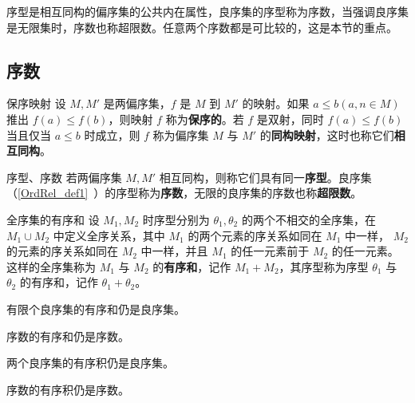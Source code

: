 序型是相互同构的偏序集的公共内在属性，良序集的序型称为序数，当强调良序集是无限集时，序数也称超限数。任意两个序数都是可比较的，这是本节的重点。
\subsection{序数}
\begin{definition}{保序映射}
设 $M,M'$ 是两偏序集，$f$ 是 $M$ 到 $M'$ 的映射。如果 $a\leq b(a,n\in M)$ 推出 $f(a)\leq f(b)$，则映射 $f$ 称为\textbf{保序的}。若 $f$ 是双射，同时 $f(a)\leq f(b)$ 当且仅当 $a\leq b$ 时成立，则 $f$ 称为偏序集 $M$ 与 $M'$ 的\textbf{同构映射}，这时也称它们\textbf{相互同构}。
\end{definition}
\begin{definition}{序型、序数}
若两偏序集 $M,M'$ 相互同构，则称它们具有同一\textbf{序型}。良序集（\autoref{OrdRel_def1}~）的序型称为\textbf{序数}，无限的良序集的序数也称\textbf{超限数}。
\end{definition}
\begin{definition}{全序集的有序和}
设 $M_1,M_2$ 时序型分别为 $\theta_1,\theta_2$ 的两个不相交的全序集，在 $M_1\cup M_2$ 中定义全序关系，其中 $M_1$ 的两个元素的序关系如同在 $M_1$ 中一样， $M_2$ 的元素的序关系如同在 $M_2$ 中一样，并且 $M_1$ 的任一元素前于 $M_2$ 的任一元素。这样的全序集称为 $M_1$ 与 $M_2$ 的\textbf{有序和}，记作 $M_1+M_2$，其序型称为序型 $\theta_1$ 与 $\theta_2$ 的有序和，记作 $\theta_1+\theta_2$。
\end{definition}
\begin{theorem}{}
有限个良序集的有序和仍是良序集。
\end{theorem}
\begin{corollary}{}
序数的有序和仍是序数。
\end{corollary}
\begin{theorem}{}
两个良序集的有序积仍是良序集。
\end{theorem}
\begin{corollary}{}
序数的有序积仍是序数。
\end{corollary}